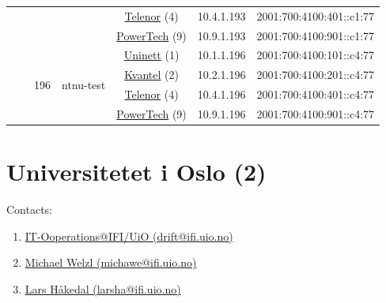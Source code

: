 \begin{small}
\begin{center}
\begin{longtable}{|c|c|c|c|c|c|c|c|}
  &  &  &  & \multicolumn{2}{|c|}{\tiny{\href{https://www.telenor.no}{Telenor} (4)}} & \tiny{10.4.1.193} & \tiny{2001:700:4100:401::c1:77} \\* \cline{5-5}\cline{6-6}\cline{7-7}\cline{8-8}
  &  &  &  & \multicolumn{2}{|c|}{\tiny{\href{http://www.powertech.no}{PowerTech} (9)}} & \tiny{10.9.1.193} & \tiny{2001:700:4100:901::c1:77} \\* \cline{3-3}\cline{4-4}\cline{5-5}\cline{6-6}\cline{7-7}\cline{8-8}
  &  & \multirow{4}{*}{\tiny{196}} & \multicolumn{1}{|l|}{\multirow{4}{*}{\tiny{ntnu-test}}} & \multicolumn{2}{|c|}{\tiny{\href{https://www.uninett.no}{Uninett} (1)}} & \tiny{10.1.1.196} & \tiny{2001:700:4100:101::c4:77} \\* \cline{5-5}\cline{6-6}\cline{7-7}\cline{8-8}
  &  &  &  & \multicolumn{2}{|c|}{\tiny{\href{http://kvantel.no}{Kvantel} (2)}} & \tiny{10.2.1.196} & \tiny{2001:700:4100:201::c4:77} \\* \cline{5-5}\cline{6-6}\cline{7-7}\cline{8-8}
  &  &  &  & \multicolumn{2}{|c|}{\tiny{\href{https://www.telenor.no}{Telenor} (4)}} & \tiny{10.4.1.196} & \tiny{2001:700:4100:401::c4:77} \\* \cline{5-5}\cline{6-6}\cline{7-7}\cline{8-8}
  &  &  &  & \multicolumn{2}{|c|}{\tiny{\href{http://www.powertech.no}{PowerTech} (9)}} & \tiny{10.9.1.196} & \tiny{2001:700:4100:901::c4:77} \\ \hline
\end{longtable}
\end{center}
\end{small}



\section{Universitetet i Oslo (2)}
\label{sec:UiO}

Contacts:
\begin{enumerate}
 \item {}\href{mailto:drift@ifi.uio.no}{IT-Ooperations@IFI/UiO (drift@ifi.uio.no)}
 \item {}\href{mailto:michawe@ifi.uio.no}{Michael Welzl (michawe@ifi.uio.no)}
 \item {}\href{mailto:larsha@ifi.uio.no}{Lars Håkedal (larsha@ifi.uio.no)}
\end{enumerate}

